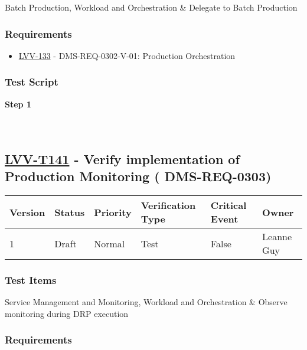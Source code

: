 Batch Production, Workload and Orchestration \& Delegate to Batch
Production

\hypertarget{requirements-117}{%
\subsubsection{Requirements}\label{requirements-117}}

\begin{itemize}
\tightlist
\item
  \href{https://jira.lsstcorp.org/browse/LVV-133}{LVV-133} -
  DMS-REQ-0302-V-01: Production Orchestration
\end{itemize}

\hypertarget{test-script-117}{%
\subsubsection{Test Script}\label{test-script-117}}

\textbf{Step 1}\\
~\\
~\\

\hypertarget{lvv-t141---verify-implementation-of-production-monitoring-dms-req-0303}{%
\subsection{\texorpdfstring{\href{https://jira.lsstcorp.org/secure/Tests.jspa\#/testCase/LVV-T141}{LVV-T141}
- Verify implementation of Production Monitoring (
DMS-REQ-0303)}{LVV-T141 - Verify implementation of Production Monitoring ( DMS-REQ-0303)}}\label{lvv-t141---verify-implementation-of-production-monitoring-dms-req-0303}}

\begin{longtable}[]{@{}llllll@{}}
\toprule
Version & Status & Priority & Verification Type & Critical Event &
Owner\tabularnewline
\midrule
\endhead
1 & Draft & Normal & Test & False & Leanne Guy\tabularnewline
\bottomrule
\end{longtable}

\hypertarget{test-items-117}{%
\subsubsection{Test Items}\label{test-items-117}}

Service Management and Monitoring, Workload and Orchestration \& Observe
monitoring during DRP execution

\hypertarget{requirements-118}{%
\subsubsection{Requirements}\label{requirements-118}}

